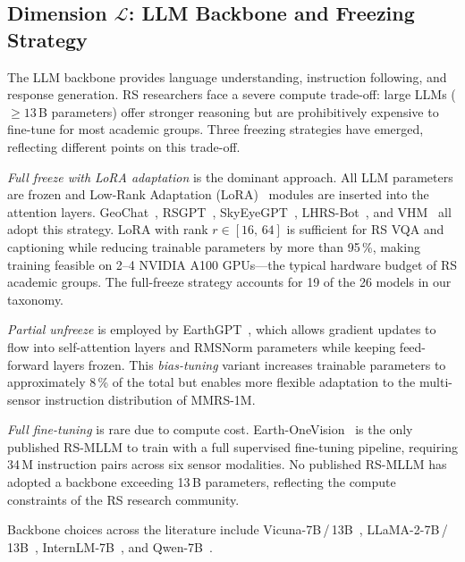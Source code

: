 \subsection{Dimension \texorpdfstring{$\mathcal{L}$}{L}: LLM Backbone and Freezing Strategy}\label{sec3:llm}

The LLM backbone provides language understanding, instruction following, and response
generation. RS researchers face a severe compute trade-off: large LLMs
($\geq\!13$\,B parameters) offer stronger reasoning but are prohibitively expensive to
fine-tune for most academic groups. Three freezing strategies have emerged, reflecting
different points on this trade-off.

\textit{Full freeze with LoRA adaptation} is the dominant approach.
All LLM parameters are frozen and Low-Rank Adaptation (LoRA)~\cite{hu2022lora} modules
are inserted into the attention layers. GeoChat~\cite{geochat2024},
RSGPT~\cite{rsgpt2023}, SkyEyeGPT~\cite{skyeyegpt2025}, LHRS-Bot~\cite{lhrsbot2024},
and VHM~\cite{vhm2025} all adopt this strategy. LoRA with rank $r \in [16,\,64]$ is
sufficient for RS VQA and captioning while reducing trainable parameters by more than
95\,\%, making training feasible on 2--4 NVIDIA A100 GPUs---the typical hardware budget
of RS academic groups. The full-freeze strategy accounts for 19 of the 26 models in our
taxonomy.

\textit{Partial unfreeze} is employed by EarthGPT~\cite{earthgpt2025}, which allows
gradient updates to flow into self-attention layers and RMSNorm parameters while keeping
feed-forward layers frozen. This \emph{bias-tuning} variant increases trainable
parameters to approximately 8\,\% of the total but enables more flexible adaptation to
the multi-sensor instruction distribution of MMRS-1M.

\textit{Full fine-tuning} is rare due to compute cost.
Earth-OneVision~\cite{earthonevision2026} is the only published RS-MLLM to train with a
full supervised fine-tuning pipeline, requiring 34\,M instruction pairs across six sensor
modalities. No published RS-MLLM has adopted a backbone exceeding 13\,B parameters,
reflecting the compute constraints of the RS research community.

Backbone choices across the literature include Vicuna-7B\,/\,13B~\cite{vicuna2023},
LLaMA-2-7B\,/\,13B~\cite{llama2023}, InternLM-7B~\cite{internlm2023}, and
Qwen-7B~\cite{qwen2023}.

